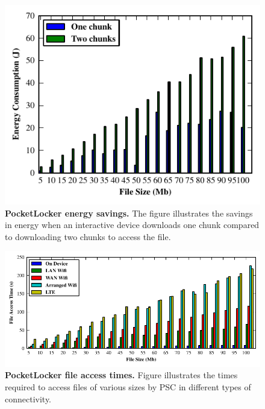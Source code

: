 \begin{figure}[t]
  
  \includegraphics[scale=.97]{./figures/energysavings.pdf}
  
  \caption{\small \textbf{PocketLocker energy savings.} The figure
    illustrates the savings in energy when an interactive device downloads
  one chunk compared to downloading two chunks to access the file.}
  
  \label{fig-evaluation-energysavings}

  \vspace*{-0.2in}
\end{figure}


\begin{figure}[t]
  \centering
  \includegraphics{./figures/downloadtimes.pdf}
  
  \vspace*{-0.1in}

  \caption{\small \textbf{PocketLocker file access times.} Figure
    illustrates the
    times required to access files of various sizes by PSC in different
    types of
  connectivity.}

  \label{fig-evaluation-download}
  
  \vspace*{0.05in}


  \vspace*{-0.2in}

\end{figure}

